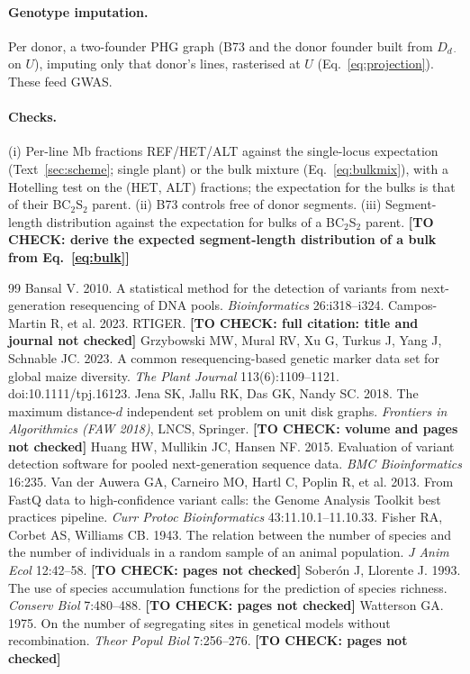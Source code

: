 \documentclass[11pt]{article}
\newcommand{\todo}[1]{\textbf{[TO CHECK: #1]}}
\begin{document}
\paragraph{Genotype imputation.} Per donor, a two-founder PHG graph (B73 and the donor founder built from $D_{d\cdot}$ on $U$), imputing
only that donor's lines, rasterised at $U$ (Eq.~\eqref{eq:projection}). These feed GWAS.

\paragraph{Checks.} (i) Per-line Mb fractions REF/HET/ALT against the single-locus expectation (Text~\ref{sec:scheme}; single plant) or
the bulk mixture (Eq.~\eqref{eq:bulkmix}), with a Hotelling test on the (HET, ALT) fractions; the expectation for the
bulks is that of their BC$_2$S$_2$ parent. (ii) B73 controls free of donor segments. (iii) Segment-length distribution against the
expectation for bulks of a BC$_2$S$_2$ parent. \todo{derive the expected segment-length distribution of a bulk from Eq.~\eqref{eq:bulk}}


\begin{thebibliography}{99}
 Bansal V. 2010. A statistical method for the detection of variants from next-generation
resequencing of DNA pools. \textit{Bioinformatics} 26:i318--i324.
 Campos-Martin R, et al. 2023. RTIGER. \todo{full citation: title and journal not checked}
 Grzybowski MW, Mural RV, Xu G, Turkus J, Yang J, Schnable JC. 2023. A common
resequencing-based genetic marker data set for global maize diversity. \textit{The Plant Journal} 113(6):1109--1121.
doi:10.1111/tpj.16123.
 Jena SK, Jallu RK, Das GK, Nandy SC. 2018. The maximum distance-$d$ independent set
problem on unit disk graphs. \textit{Frontiers in Algorithmics (FAW 2018)}, LNCS, Springer. \todo{volume and pages not checked}
 Huang HW, Mullikin JC, Hansen NF. 2015. Evaluation of variant detection software for pooled
next-generation sequence data. \textit{BMC Bioinformatics} 16:235.
 Van der Auwera GA, Carneiro MO, Hartl C, Poplin R, et al. 2013. From FastQ data to
high-confidence variant calls: the Genome Analysis Toolkit best practices pipeline. \textit{Curr Protoc Bioinformatics} 43:11.10.1--11.10.33.
 Fisher RA, Corbet AS, Williams CB. 1943. The relation between the number of species and the
number of individuals in a random sample of an animal population. \textit{J Anim Ecol} 12:42--58. \todo{pages not checked}
 Sober\'on J, Llorente J. 1993. The use of species accumulation functions
for the prediction of species richness. \textit{Conserv Biol} 7:480--488. \todo{pages not checked}
 Watterson GA. 1975. On the number of segregating sites in genetical models without
recombination. \textit{Theor Popul Biol} 7:256--276. \todo{pages not checked}
\end{thebibliography}
\end{document}
